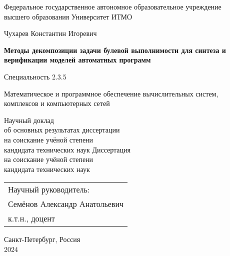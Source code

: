 \thispagestyle{empty}

\begin{center}
    Федеральное государственное автономное образовательное учреждение \\
    высшего образования Университет ИТМО
\end{center}

\vspace{0pt plus2fill}

\begin{center}

{\large
    Чухарев Константин Игоревич
}

\vspace{1cm}

\textbf{\large
Методы декомпозиции задачи булевой выполнимости для синтеза и верификации моделей автоматных программ
}

\vspace{1cm}

Специальность 2.3.5
\begin{SingleSpace*}
    \small
    Математическое и программное обеспечение вычислительных систем, \\
    комплексов и компьютерных сетей
\end{SingleSpace*}

\vspace{1cm}

\ifsynopsis
Научный доклад \\
об основных результатах диссертации \\
на соискание учёной степени \\
кандидата технических наук
\else
Диссертация \\
на соискание учёной степени \\
кандидата технических наук
\fi

\end{center}

\vspace{0pt plus1fill}

\hfill\begin{tabular}{l}
Научный руководитель: \\
Семёнов Александр Анатольевич \\
к.т.н., доцент
\end{tabular}

\vspace{0pt plus1fill}

\begin{center}
    Санкт-Петербург, Россия \\
    2024
\end{center}
